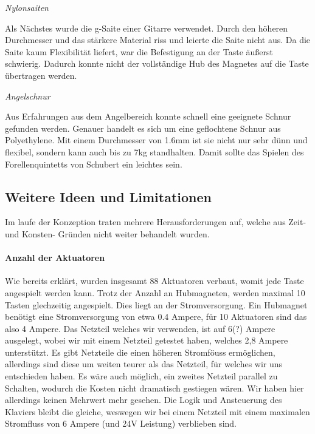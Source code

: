 \textit{Nylonsaiten}

Als Nächstes wurde die g-Saite einer Gitarre verwendet.
Durch den höheren Durchmesser und das stärkere Material riss und leierte die Saite nicht aus.
Da die Saite kaum Flexibilität liefert, war die Befestigung an der Taste äußerst schwierig.
Dadurch konnte nicht der vollständige Hub des Magnetes auf die Taste übertragen werden.

\textit{Angelschnur}

Aus Erfahrungen aus dem Angelbereich konnte schnell eine geeignete Schnur gefunden werden.
Genauer handelt es sich um eine geflochtene Schnur aus Polyethylene.
Mit einem Durchmesser von 1.6mm ist sie nicht nur sehr dünn und flexibel, sondern kann auch bis zu 7kg standhalten.
Damit sollte das Spielen des Forellenquintetts von Schubert ein leichtes sein.



\subsection{Weitere Ideen und Limitationen}

Im laufe der Konzeption traten mehrere Herausforderungen auf, welche aus Zeit- und Konsten- Gründen nicht weiter
behandelt wurden.
\paragraph{Anzahl der Aktuatoren}
Wie bereits erklärt, wurden insgesamt 88 Aktuatoren verbaut, womit jede Taste angespielt werden kann. Trotz der Anzahl an
Hubmagneten, werden maximal 10 Tasten glechzeitig angespielt. Dies liegt an der Stromversorgung. Ein Hubmagnet benötigt
eine Stromversorgung von etwa 0.4 Ampere, für 10 Aktuatoren sind das also 4 Ampere. Das Netzteil welches wir verwenden, ist auf
6(?) Ampere ausgelegt, wobei wir mit einem Netzteil getestet haben, welches 2,8 Ampere unterstützt. Es gibt Netzteile die
einen höheren Stromföuss ermöglichen, allerdings sind diese um weiten teurer als das Netzteil, für welches wir uns entschieden haben.
Es wäre auch möglich, ein zweites Netzteil parallel zu Schalten, wodurch die Kosten nicht dramatisch gestiegen wären.
Wir haben hier allerdings keinen Mehrwert mehr gesehen. Die Logik und Ansteuerung des Klaviers bleibt die gleiche, weswegen
wir bei einem Netzteil mit einem maximalen Stromfluss von 6 Ampere (und 24V Leistung) verblieben sind.

